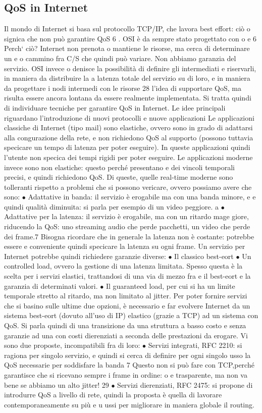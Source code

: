 \subsection{QoS in Internet}
Il mondo di Internet si basa sul protocollo TCP/IP, che lavora best effort: ciò
o
signica che non può garantire QoS 6 . OSI è da sempre stato progettato con
o
e
6 Perch` ciò? Internet non prenota o mantiene le risorse, ma cerca di determinare un
e o
cammino fra C/S che quindi può variare. Non abbiamo garanzia del servizio. OSI invece
o
denisce la possibilità di definire gli intermediati e riservarli, in maniera da distribuire la
a
latenza totale del servizio su di loro, e in maniera da progettare i nodi intermedi con le risorse
28
l'idea di supportare QoS, ma risulta essere ancora lontana da essere realmente
implementata. Si tratta quindi di individuare tecniche per garantire QoS in Internet. Le idee principali riguardano
l'introduzione di nuovi protocolli e nuove
applicazioni
Le applicazioni classiche di Internet (tipo mail) sono elastiche, ovvero sono
in grado di adattarsi alla congurazione della rete, e non richiedono QoS al
supporto (possono tuttavia specicare un tempo di latenza per poter eseguire).
In queste applicazioni quindi l'utente non specica dei tempi rigidi per poter
eseguire.
Le applicazioni moderne invece sono non elastiche: questo perché presentano
e
dei vincoli temporali precisi, e quindi richiedono QoS. Di queste, quelle real-time
moderne sono tolleranti rispetto a problemi che si possono vericare, ovvero
possiamo avere che sono:
$\bullet$ Adattative in banda: il servizio è erogabile ma con una banda minore, e
e
quindi qualità diminuita: si parla per esempio di un video peggiore.
a
$\bullet$ Adattative per la latenza: il servizio è erogabile, ma con un ritardo mage
giore, riducendo la QoS: uno streaming audio che perde pacchetti, un video
che perde dei frame.7
Bisogna ricordare che in generale la latenza non è costante: potrebbe essere
e
conveniente quindi specicare la latenza su ogni frame.
Un servizio per Internet potrebbe quindi richiedere garanzie diverse:
$\bullet$ Il classico best-eort
$\bullet$ Un controlled load, ovvero la gestione di una latenza limitata. Spesso
questa è la scelta per i servizi elastici, trattandosi di una via di mezzo fra
e
il best-eort e la garanzia di determinati valori.
$\bullet$ Il guaranteed load, per cui si ha un limite temporale stretto al ritardo, ma
non limitato al jitter.
Per poter fornire servizi che si basino sulle ultime due opzioni, è necessario
e
far evolvere Internet da un sistema best-eort (dovuto all'uso di IP) elastico
(grazie a TCP) ad un sistema con QoS. Si parla quindi di una transizione da
una struttura a basso costo e senza garanzie ad una con costi dierenziati a
seconda delle prestazioni da erogare. Vi sono due proposte, incompatibili fra di
loro:
$\bullet$ Servizi integrati, RFC 2210: si ragiona per singolo servizio, e quindi si
cerca di definire per ogni singolo usso la QoS
necessarie per soddisfare la banda
7 Questo non si può fare con TCP,perché garantisce che si ricevano sempre i frame in ordine:
o
e
trasparente, ma non va bene se abbiamo un alto jitter!
29
$\bullet$ Servizi dierenziati, RFC 2475: si propone di introdurre QoS a livello di
rete, quindi la proposta è quella di lavorare contemporaneamente su più
e
u
ussi per migliorare in maniera globale il routing.
